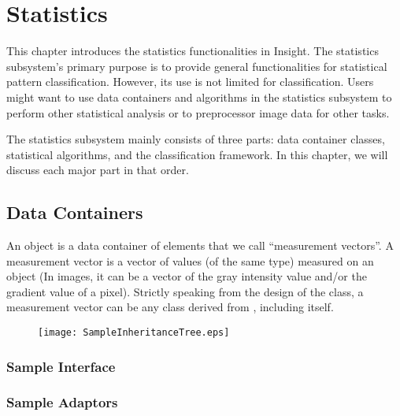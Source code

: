 \chapter{Statistics}
\label{sec:StaisticsFramework}

This chapter introduces the statistics functionalities in Insight. The
statistics subsystem's primary purpose is to provide general functionalities
for statistical pattern classification. However, its use is not limited
for classification. Users might want to use data containers and
algorithms in the statistics subsystem to perform other statistical
analysis or to preprocessor image data for other tasks.

The statistics subsystem mainly consists of three parts: data container
classes, statistical algorithms, and the classification framework. In this
chapter, we will discuss each major part in that order.

\section{Data Containers}
\label{sec:StatisticsDataContainer}

An  object is a data container of
elements that we call ``measurement vectors''. A measurement vector is a
vector of values (of the same type) measured on an object (In images, it
can be a vector of the gray intensity value and/or the gradient value of
a pixel). Strictly speaking from the design of the
 class, a measurement vector can be any
class derived from , including 
itself.

\begin{figure}
  \centering
  \texttt{[image: SampleInheritanceTree.eps]}
  \protect\label{fig:SampleInheritanceTree}
\end{figure}

\subsection{Sample Interface}
\label{sec:SampleInterface}



\subsection{Sample Adaptors}
\label{sec:SampleAdaptors}

